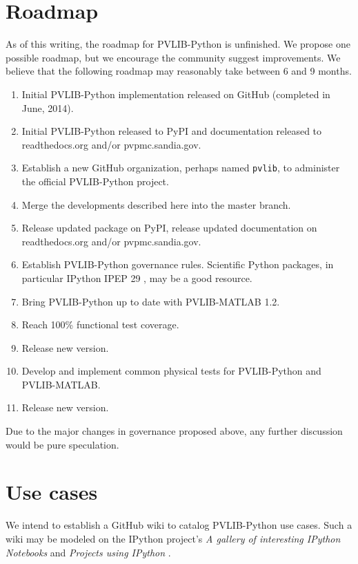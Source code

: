 \documentclass[conference]{IEEEtran}
\begin{document}
\section{Roadmap}

As of this writing, the roadmap for PVLIB-Python is unfinished. 
We propose one possible roadmap, but we encourage the community suggest improvements. 
We believe that the following roadmap may reasonably take between 6 and 9 months. 

\begin{enumerate}
\item Initial PVLIB-Python implementation released on GitHub (completed in June, 2014).
\item Initial PVLIB-Python released to PyPI and documentation released to readthedocs.org and/or pvpmc.sandia.gov.
\item Establish a new GitHub organization, perhaps named \texttt{pvlib}, to administer the official PVLIB-Python project.
\item Merge the developments described here into the master branch.
\item Release updated package on PyPI, release updated documentation on readthedocs.org and/or pvpmc.sandia.gov.
\item Establish PVLIB-Python governance rules. Scientific Python packages, in particular IPython IPEP 29 \cite{ipython-gov}, may be a good resource.
\item Bring PVLIB-Python up to date with PVLIB-MATLAB 1.2.
\item Reach 100\% functional test coverage.
\item Release new version.
\item Develop and implement common physical tests for PVLIB-Python and PVLIB-MATLAB.
\item Release new version.
\end{enumerate}

Due to the major changes in governance proposed above, any further discussion would be pure speculation.



\section{Use cases}

We intend to establish a GitHub wiki to catalog PVLIB-Python use cases. Such a wiki may be modeled on the IPython project's \emph{A gallery of interesting IPython Notebooks} and \emph{Projects using IPython} \cite{ipython-wiki}. 
\end{document}
